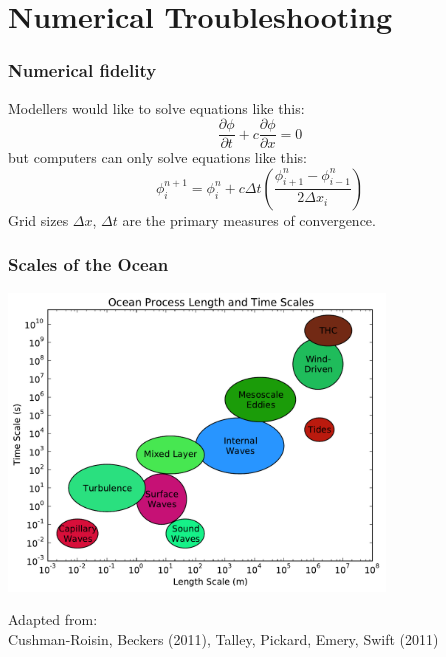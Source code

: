 \documentclass[red]{beamer}
\begin{document}
\section{Numerical Troubleshooting}
\begin{frame}
    \frametitle{Numerical fidelity}
    
    Modellers would like to solve equations like this:
    $$
    \frac{\partial \phi}{\partial t} + c \frac{\partial \phi}{\partial x} = 0
    $$
    but computers can only solve equations like this:
    $$
    \phi^{n+1}_i = \phi^n_i + c \Delta t
        \left(\frac{\phi^n_{i+1} - \phi^n_{i-1}}{2\Delta x_i} \right)
    $$
    Grid sizes $\Delta x$, $\Delta t$ are the primary measures of convergence.
\end{frame}

\begin{frame}
    \frametitle{Scales of the Ocean}
    
    \begin{center}
        \includegraphics[width=0.75\textwidth]{ocean_scales.pdf}
    \end{center}
    
    {\tiny Adapted from:\\
        Cushman-Roisin, Beckers (2011), Talley, Pickard, Emery, Swift (2011)}
\end{frame}
\end{document}
